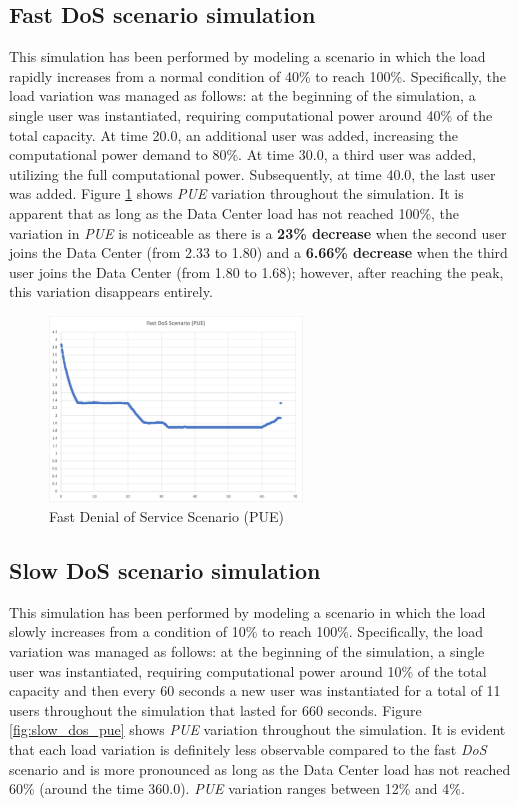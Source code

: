 \subsection{Fast DoS scenario simulation}
This simulation has been performed by modeling a scenario in which the load rapidly increases from a normal condition of 40\% to reach 100\%. Specifically, the load variation was managed as follows: at the beginning of the simulation, a single user was instantiated, requiring computational power around 40\% of the total capacity. At time 20.0, an additional user was added, increasing the computational power demand to 80\%. At time 30.0, a third user was added, utilizing the full computational power. Subsequently, at time 40.0, the last user was added. Figure \ref{fig:fast_dos_pue} shows \emph{PUE} variation throughout the simulation. It is apparent that as long as the Data Center load has not reached 100\%, the variation in \emph{PUE} is noticeable as there is a \textbf{23\% decrease} when the second user joins the Data Center (from 2.33 to 1.80) and a \textbf{6.66\% decrease} when the third user joins the Data Center (from 1.80 to 1.68); however, after reaching the peak, this variation disappears entirely. 
\begin{figure}[h]
    \centering
    \includegraphics[width=0.6\textwidth]{chapters/images/fast_dos_pue.png}
    \caption{Fast Denial of Service Scenario (PUE)}
    \label{fig:fast_dos_pue}
\end{figure}

\subsection{Slow DoS scenario simulation}
This simulation has been performed by modeling a scenario in which the load slowly increases from a condition of 10\% to reach 100\%. Specifically, the load variation was managed as follows: at the beginning of the simulation, a single user was instantiated, requiring computational power around 10\% of the total capacity and then every 60 seconds a new user was instantiated for a total of 11 users throughout the simulation that lasted for 660 seconds. Figure \ref{fig:slow_dos_pue} shows \emph{PUE} variation throughout the simulation. It is evident that each load variation is definitely less observable compared to the fast \emph{DoS} scenario and is more pronounced as long as the Data Center load has not reached 60\% (around the time 360.0). \emph{PUE} variation ranges between 12\% and 4\%. 

